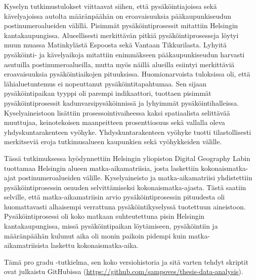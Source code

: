 Kyselyn tutkimustulokset viittaavat siihen, että pysäköintiajoissa sekä kävelyajoissa autolta määränpäähän on eroavaisuuksia pääkaupunkiseudun postinumeroalueiden välillä. Pisimmät pysäköintiprosessit mitattiin Helsingin kantakaupungissa. Alueellisesti merkittävän pitkiä pysäköintiprosesseja löytyi muun muassa Matinkylästä Espoosta sekä Vantaan Tikkurilasta. Lyhyitä pysäköinti- ja kävelyaikoja mitattiin enimmäkseen pääkaupunkiseudun harvasti asutuilla postinumeroalueilla, mutta myös näillä alueilla esiintyi merkittäviä eroavaisuuksia pysäköintiaikojen pituuksissa. Huomionarvoista tuloksissa oli, että lähialuetuntemus ei nopeuttanut pysäköintitapahtumaa. Sen sijaan pysäköintipaikan tyyppi oli parempi indikaattori, tuottaen pisimmät pysäköintiprosessit kadunvarsipysäköinnissä ja lyhyimmät pysäköintihalleissa. Kyselyaineistoon lisättiin prosessointivaiheessa kaksi spatiaalista selittävää muuttujaa, keinotekoisen maanpeitteen prosenttiosuus sekä vallalla oleva yhdyskuntarakenteen vyöhyke. Yhdyskuntarakenteen vyöhyke tuotti tilastollisesti merkitseviä eroja tutkimusalueen kaupunkien sekä vyöhykkeiden välille.

Tässä tutkimuksessa hyödynnettiin Helsingin yliopiston Digital Geography Labin tuottamaa Helsingin alueen matka-aikamatriisia, josta laskettiin kokonaismatka-ajat postinumeroalueiden välille. Kyselyaineisto ja matka-aikamatriisi yhdistettiin pysäköintiprosessin osuuden selvittämiseksi kokonaismatka-ajasta. Tästä saatiin selville, että matka-aikamatriisin arvio pysäköintiprosessin pituudesta oli huomattavasti alhaisempi verrattuna pysäköintikyselyssä tuotettuun aineistoon. Pysäköintiprosessi oli koko matkaan suhteutettuna pisin Helsingin kantakaupungissa, missä pysäköintipaikan löytämiseen, pysäköintiin ja määränpäähän kulunut aika oli monin paikoin pidempi kuin matka-aikamatriisista laskettu kokonaismatka-aika.

Tämä pro gradu -tutkielma, sen koko versiohistoria ja sitä varten tehdyt skriptit ovat julkaistu GitHubissa (\textcolor{blue}{\url{https://github.com/sampoves/thesis-data-analysis}}).